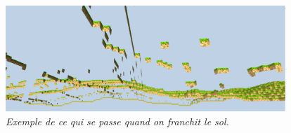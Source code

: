\begin{center}
	\includegraphics[height=4cm]{images/screen_fail.png}\\
	\textit{Exemple de ce qui se passe quand on franchit le sol.}
\end{center}







